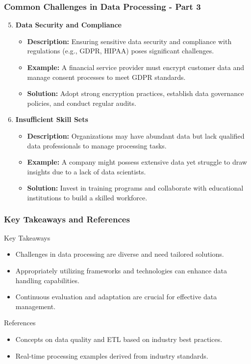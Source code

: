 \documentclass[aspectratio=169]{beamer}
\begin{document}
\begin{frame}[fragile]
    \frametitle{Common Challenges in Data Processing - Part 3}
    \begin{enumerate}
        \setcounter{enumi}{4}
        \item \textbf{Data Security and Compliance}
        \begin{itemize}
            \item \textbf{Description:} Ensuring sensitive data security and compliance with regulations (e.g., GDPR, HIPAA) poses significant challenges.
            \item \textbf{Example:} A financial service provider must encrypt customer data and manage consent processes to meet GDPR standards.
            \item \textbf{Solution:} Adopt strong encryption practices, establish data governance policies, and conduct regular audits.
        \end{itemize}

        \item \textbf{Insufficient Skill Sets}
        \begin{itemize}
            \item \textbf{Description:} Organizations may have abundant data but lack qualified data professionals to manage processing tasks.
            \item \textbf{Example:} A company might possess extensive data yet struggle to draw insights due to a lack of data scientists.
            \item \textbf{Solution:} Invest in training programs and collaborate with educational institutions to build a skilled workforce.
        \end{itemize}
    \end{enumerate}
\end{frame}

\begin{frame}[fragile]
    \frametitle{Key Takeaways and References}
    \begin{block}{Key Takeaways}
        \begin{itemize}
            \item Challenges in data processing are diverse and need tailored solutions.
            \item Appropriately utilizing frameworks and technologies can enhance data handling capabilities.
            \item Continuous evaluation and adaptation are crucial for effective data management.
        \end{itemize}
    \end{block}

    \begin{block}{References}
        \begin{itemize}
            \item Concepts on data quality and ETL based on industry best practices.
            \item Real-time processing examples derived from industry standards.
        \end{itemize}
    \end{block}
\end{frame}
\end{document}
